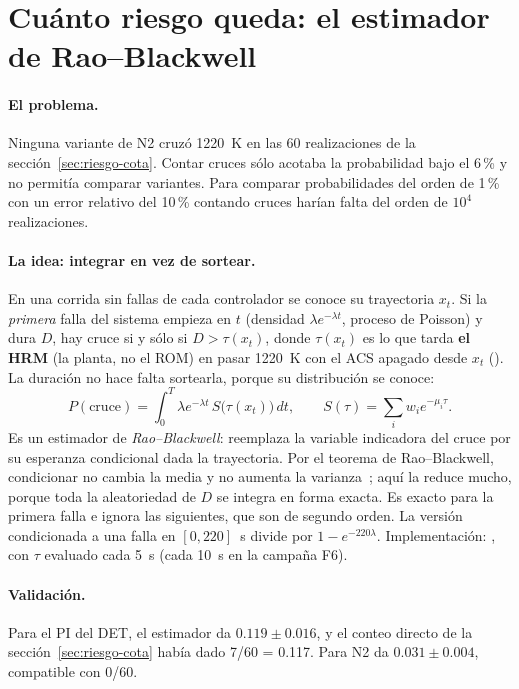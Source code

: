 \section{Cuánto riesgo queda: el estimador de Rao--Blackwell}\label{sec:riesgo-rb}
\paragraph{El problema.} Ninguna variante de N2 cruzó 1220~K en las 60 realizaciones de la
sección~\ref{sec:riesgo-cota}. Contar cruces sólo acotaba la probabilidad bajo el 6\,\% y no
permitía comparar variantes. Para comparar probabilidades del orden de 1\,\% con un error
relativo del 10\,\% contando cruces harían falta del orden de $10^4$ realizaciones.

\paragraph{La idea: integrar en vez de sortear.} En una corrida sin fallas de cada
controlador se conoce su trayectoria $x_t$. Si la \emph{primera} falla del sistema empieza en
$t$ (densidad $\lambda e^{-\lambda t}$, proceso de Poisson) y dura $D$, hay cruce si y sólo si
$D>\tau(x_t)$, donde $\tau(x_t)$ es lo que tarda \textbf{el HRM} (la planta, no el ROM) en pasar
1220~K con el ACS apagado desde $x_t$ (). La duración no hace falta
sortearla, porque su distribución se conoce:
\[
P(\text{cruce})=\int_0^T\lambda e^{-\lambda t}\,S\big(\tau(x_t)\big)\,dt,\qquad
S(\tau)=\sum_i w_ie^{-\mu_i\tau}.
\]
Es un estimador de \emph{Rao--Blackwell}: reemplaza la variable indicadora del cruce por su
esperanza condicional dada la trayectoria. Por el teorema de Rao--Blackwell, condicionar no
cambia la media y no aumenta la varianza~\cite{casella2002}; aquí la reduce mucho, porque toda la
aleatoriedad de $D$ se integra en forma exacta. Es exacto para la primera falla e ignora las
siguientes, que son de segundo orden. La versión condicionada a una falla en $[0,220]$~s divide
por $1-e^{-220\lambda}$. Implementación: , con $\tau$ evaluado
cada 5~s (cada 10~s en la campaña F6).

\paragraph{Validación.} Para el PI del DET, el estimador da $0.119\pm0.016$, y el conteo directo
de la sección~\ref{sec:riesgo-cota} había dado 7/60 = 0.117. Para N2 da $0.031\pm0.004$,
compatible con 0/60.


